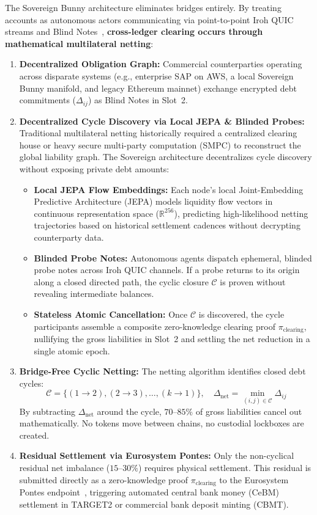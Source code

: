 \documentclass[a4paper,11pt,twoside,parskip=half-,headings=small]{scrartcl}
\begin{document}
The Sovereign Bunny architecture eliminates bridges entirely. By treating accounts as autonomous actors communicating via point-to-point Iroh QUIC streams and Blind Notes~\cite{williamson2022aztec}, \textbf{cross-ledger clearing occurs through mathematical multilateral netting}:
\begin{enumerate}
  \item \textbf{Decentralized Obligation Graph:} Commercial counterparties operating across disparate systems (e.g., enterprise SAP on AWS, a local Sovereign Bunny manifold, and legacy Ethereum mainnet) exchange encrypted debt commitments ($\Delta_{ij}$) as Blind Notes in Slot~2.
  \item \textbf{Decentralized Cycle Discovery via Local JEPA \& Blinded Probes:} Traditional multilateral netting historically required a centralized clearing house or heavy secure multi-party computation (SMPC) to reconstruct the global liability graph. The Sovereign architecture decentralizes cycle discovery without exposing private debt amounts:
  \begin{itemize}
    \item \textbf{Local JEPA Flow Embeddings:} Each node's local Joint-Embedding Predictive Architecture (JEPA) models liquidity flow vectors in continuous representation space ($\mathbb{R}^{256}$), predicting high-likelihood netting trajectories based on historical settlement cadences without decrypting counterparty data.
    \item \textbf{Blinded Probe Notes:} Autonomous agents dispatch ephemeral, blinded probe notes across Iroh QUIC channels. If a probe returns to its origin along a closed directed path, the cyclic closure $\mathcal{C}$ is proven without revealing intermediate balances.
    \item \textbf{Stateless Atomic Cancellation:} Once $\mathcal{C}$ is discovered, the cycle participants assemble a composite zero-knowledge clearing proof $\pi_{\text{clearing}}$, nullifying the gross liabilities in Slot~2 and settling the net reduction in a single atomic epoch.
  \end{itemize}
  \item \textbf{Bridge-Free Cyclic Netting:} The netting algorithm identifies closed debt cycles:
  \begin{equation}
    \mathcal{C} = \{(1 \to 2), (2 \to 3), \dots, (k \to 1)\}, \quad \Delta_{\text{net}} = \min_{(i,j) \in \mathcal{C}} \Delta_{ij}
  \end{equation}
  By subtracting $\Delta_{\text{net}}$ around the cycle, $70$--$85\%$ of gross liabilities cancel out mathematically. No tokens move between chains, no custodial lockboxes are created.
  \item \textbf{Residual Settlement via Eurosystem Pontes:} Only the non-cyclical residual net imbalance ($15$--$30\%$) requires physical settlement. This residual is submitted directly as a zero-knowledge proof $\pi_{\text{clearing}}$ to the Eurosystem Pontes endpoint~\cite{ecbpontes}, triggering automated central bank money (CeBM) settlement in TARGET2 or commercial bank deposit minting (CBMT).
\end{enumerate}
\end{document}

